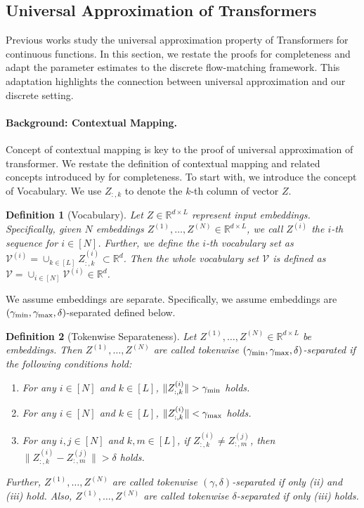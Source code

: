 \documentclass[12pt]{article}
\numberwithin{equation}{section}
\def\R{\mathbb{R}}
\theoremstyle{theoremstyle}
\newtheorem{definition}{Definition}[section]
\numberwithin{equation}{section}
\numberwithin{theorem}{section}
\numberwithin{proposition}{section}
\numberwithin{definition}{section}
\numberwithin{lemma}{section}
\numberwithin{assumption}{section}
\numberwithin{remark}{section}
\begin{document}
\subsection{Universal Approximation of Transformers}
\label{sec:universal_appro}
Previous works \citep{hu2024statistical,kajitsuka2023transformers,yun2019transformers} study the universal approximation property of Transformers for continuous functions.
In this section, we restate the proofs for completeness and adapt the parameter estimates to the discrete flow-matching framework.
This adaptation highlights the connection between universal approximation and our discrete setting.


\paragraph{Background: Contextual Mapping.}
Concept of contextual mapping is key to the proof of universal approximation of transformer.
We restate the definition of contextual mapping and related concepts introduced by \citet{kajitsuka2023transformers} for completeness.
To start with, we introduce the concept of Vocabulary.
We use $Z_{:,k}$ to denote the $k$-th column of vector $Z$.
\begin{definition}[Vocabulary]
Let $Z\in\R^{d\times L}$ represent input embeddings.
Specifically, given $N$ embeddings $Z^{(1)},\dots,Z^{(N)}\in\R^{d\times L}$, we call $Z^{(i)}$ the $i$-th sequence for $i\in[N]$.
Further, we define the $i$-th vocabulary set as $\mathcal{V}^{(i)}=\cup_{k\in[L]}Z^{(i)}_{:,k}\subset\R^d$.
Then the whole vocabulary set $\mathcal{V}$ is defined as $\mathcal{V}=\cup_{i\in[N]}\mathcal{V}^{(i)}\in\R^d$.
\end{definition}

We assume embeddings are separate.
Specifically, we assume embeddings are $(\gamma_{\rm min},\gamma_{\rm max},\delta)$-separated defined below.

\begin{definition}[Tokenwise Separateness]\label{def:tokenwise_separateness}
Let $Z^{(1)},\dots,Z^{(N)}\in\R^{d\times L}$ be embeddings.
Then $Z^{(1)},\dots,Z^{(N)}$ are called tokenwise $(\gamma_{\rm min},\gamma_{\rm max},\delta)$-separated if the following conditions hold:
\begin{enumerate}
    \item [(i)] For any $i\in[N]$ and $k\in[L]$, $\|Z^{(i)}_{:,k}\|>\gamma_{\rm min}$ holds.

    \item [(ii)] For any $i\in[N]$ and $k\in[L]$, $\|Z^{(i)}_{:,k}\|<\gamma_{\rm max}$ holds.

    \item [(iii)] For any $i,j\in[N]$ and $k,m\in[L]$, if $Z^{(i)}_{:,k}\neq Z^{(j)}_{:,m}$, then $\|Z^{(i)}_{:,k}- Z^{(j)}_{:,m}\|>\delta$ holds.
\end{enumerate}


Further, $Z^{(1)},\dots,Z^{(N)}$ are called tokenwise $(\gamma,\delta)$-separated if only (ii) and (iii) hold.
Also, $Z^{(1)},\dots,Z^{(N)}$ are called tokenwise $\delta$-separated if only (iii) holds.
\end{definition}
\end{document}
